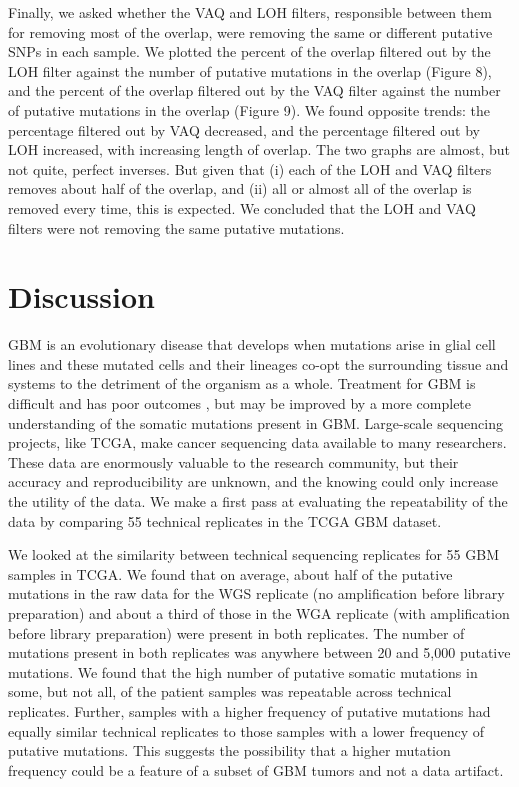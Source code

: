 \documentclass[11pt]{article} %
\begin{document}
Finally, we asked whether the VAQ and LOH filters, responsible between them for removing most of the overlap, were removing the same or different putative SNPs in each sample. We plotted the percent of the overlap filtered out by the LOH filter against the number of putative mutations in the overlap (Figure 8), and the percent of the overlap filtered out by the VAQ filter against the number of putative mutations in the overlap (Figure 9). We found opposite trends: the percentage filtered out by VAQ decreased, and the percentage filtered out by LOH increased, with increasing length of overlap. The two graphs are almost, but not quite, perfect inverses. But given that (i) each of the LOH and VAQ filters removes about half of the overlap, and (ii) all or almost all of the overlap is removed every time, this is expected. We concluded that the LOH and VAQ filters were not removing the same putative mutations. 

\section*{Discussion}

GBM is an evolutionary disease that develops when mutations arise in glial cell lines and these mutated cells and their lineages co-opt the surrounding tissue and systems to the detriment of the organism as a whole. Treatment for GBM is difficult and has poor outcomes \citep{GBM-stats}, but may be improved by a more complete understanding of the somatic mutations present in GBM. Large-scale sequencing projects, like TCGA, make cancer sequencing data available to many researchers. These data are enormously valuable to the research community, but their accuracy and reproducibility are unknown, and the knowing could only increase the utility of the data. We make a first pass at evaluating the repeatability of the data by comparing 55 technical replicates in the TCGA GBM dataset.  

We looked at the similarity between technical sequencing replicates for 55 GBM samples in TCGA. We found that on average, about half of the putative mutations in the raw data for the WGS replicate (no amplification before library preparation) and about a third of those in the WGA replicate (with amplification before library preparation) were present in both replicates. The number of mutations present in both replicates was anywhere between 20 and 5,000 putative mutations. We found that the high number of putative somatic mutations in some, but not all, of the patient samples was repeatable across technical replicates. Further, samples with a higher frequency of putative mutations had equally similar technical replicates to those samples with a lower frequency of putative mutations. This suggests the possibility that a higher mutation frequency could be a feature of a subset of GBM tumors and not a data artifact.
\end{document}
